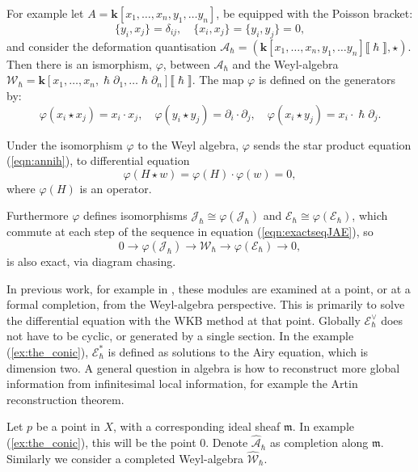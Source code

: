     \begin{ex} 
    For example let \(A=\mathbf{k}[x_1,\dots,x_n,y_1,\dots y_n]\), be equipped with the Poisson bracket:  \[\{y_i,x_j\} = \delta_{ij}, \quad  \{x_i,x_j \} = \{ y_i,y_j\} = 0,\] and consider the deformation quantisation \( \mathcal{A}_{\hslash} = (\mathbf{k}[x_1,\dots,x_n,y_1,\dots y_n]\lBrack\hslash \rBrack, \star )\).
    Then there is an ismorphism, \( \varphi\), between \( \mathcal{A}_{\hslash}\) and the Weyl-algebra \( \mathcal{W}_{\hslash} = \mathbf{k} [x_1, \dots, x_n , \hslash \partial_1 , \dots \hslash \partial_n ] \lBrack \hslash \rBrack\). The map \( \varphi\) is defined on the generators by:
    \[ \varphi(x_i \star x_j) = x_i \cdot  x_j, \quad \varphi( y_i \star y_j) = \partial_i \cdot \partial_j, \quad \varphi(x_i \star y_j ) = x_i \cdot \hslash \partial_j. \]
    \end{ex}
    
    Under the isomorphism \( \varphi\) to the Weyl algebra, \( \varphi\) sends the star product equation (\ref{eqn:annih}), to differential equation
    \[ \varphi(H \star w ) = \varphi(H) \cdot \varphi(w) = 0,\]
    where \( \varphi(H)\) is an operator. 
    
    Furthermore \( \varphi\) defines isomorphisms \(  \mathcal{J}_{\hslash}\cong \varphi(\mathcal{J}_{\hslash})\) and \( \mathcal{E}_{\hslash} \cong \varphi ( \mathcal{E}_{\hslash})\), which commute at each step of the sequence in equation (\ref{eqn:exactseqJAE}), so 
    \[ 0 \rightarrow \varphi(\mathcal{J}_{\hslash}) \rightarrow \mathcal{W}_{\hslash} \rightarrow \varphi(\mathcal{E}_{\hslash}) \rightarrow 0, \]
    is also exact, via diagram chasing. 
    
    In previous work, for example in \cite{norbury_quant, ks_airy}, these modules are examined at a point, or at a formal completion, from the Weyl-algebra perspective. This is primarily to solve the differential equation with the WKB method at that point.
    Globally \( \mathcal{E}_{\hslash}^{\vee}\) does not have to be cyclic, or generated by a single section. In the example (\ref{ex:the_conic}), \( \mathcal{E}_{\hslash}^*\) is defined as solutions to the Airy equation, which is dimension two. A general question in algebra is how to reconstruct more global information from infinitesimal local information, for example the Artin reconstruction theorem.
    
    Let \(p\) be a point in \(X\), with a corresponding ideal sheaf \( \mathfrak{m}\). In example (\ref{ex:the_conic}), this will be the point \(0\). Denote \( \widehat{\mathcal{A}}_{\hslash}\) as completion along \( \mathfrak{m}\). Similarly we consider a completed Weyl-algebra \( \widehat{\mathcal{W}}_{\hslash}\). 
    
